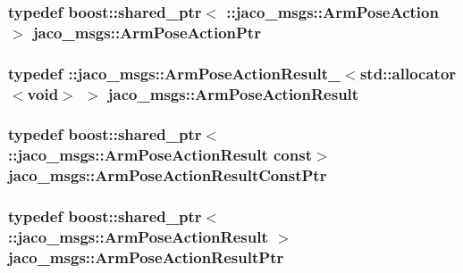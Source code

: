 \subsubsection[{\texorpdfstring{Arm\+Pose\+Action\+Ptr}{ArmPoseActionPtr}}]{\setlength{\rightskip}{0pt plus 5cm}typedef boost\+::shared\+\_\+ptr$<$ \+::{\bf jaco\+\_\+msgs\+::\+Arm\+Pose\+Action} $>$ {\bf jaco\+\_\+msgs\+::\+Arm\+Pose\+Action\+Ptr}}\hypertarget{namespacejaco__msgs_afef278ef50dd1a68d06d2b5be897ea34}{}\label{namespacejaco__msgs_afef278ef50dd1a68d06d2b5be897ea34}
\subsubsection[{\texorpdfstring{Arm\+Pose\+Action\+Result}{ArmPoseActionResult}}]{\setlength{\rightskip}{0pt plus 5cm}typedef \+::{\bf jaco\+\_\+msgs\+::\+Arm\+Pose\+Action\+Result\+\_\+}$<$std\+::allocator$<$void$>$ $>$ {\bf jaco\+\_\+msgs\+::\+Arm\+Pose\+Action\+Result}}\hypertarget{namespacejaco__msgs_aafa68684686d8122bbaaf8f61eef394f}{}\label{namespacejaco__msgs_aafa68684686d8122bbaaf8f61eef394f}
\subsubsection[{\texorpdfstring{Arm\+Pose\+Action\+Result\+Const\+Ptr}{ArmPoseActionResultConstPtr}}]{\setlength{\rightskip}{0pt plus 5cm}typedef boost\+::shared\+\_\+ptr$<$ \+::{\bf jaco\+\_\+msgs\+::\+Arm\+Pose\+Action\+Result} const$>$ {\bf jaco\+\_\+msgs\+::\+Arm\+Pose\+Action\+Result\+Const\+Ptr}}\hypertarget{namespacejaco__msgs_a474756c244b76ca143f4edf26b50ac4f}{}\label{namespacejaco__msgs_a474756c244b76ca143f4edf26b50ac4f}
\subsubsection[{\texorpdfstring{Arm\+Pose\+Action\+Result\+Ptr}{ArmPoseActionResultPtr}}]{\setlength{\rightskip}{0pt plus 5cm}typedef boost\+::shared\+\_\+ptr$<$ \+::{\bf jaco\+\_\+msgs\+::\+Arm\+Pose\+Action\+Result} $>$ {\bf jaco\+\_\+msgs\+::\+Arm\+Pose\+Action\+Result\+Ptr}}\hypertarget{namespacejaco__msgs_ae916708101497e9b3d848df7bc82307c}{}\label{namespacejaco__msgs_ae916708101497e9b3d848df7bc82307c}
